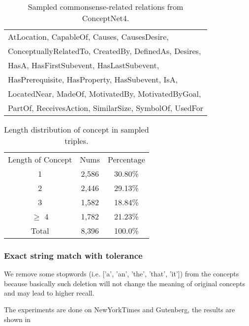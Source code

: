 \begin{table}[th]
	\scriptsize
	\centering
	\begin{tabular}{l}
		\toprule
		AtLocation, CapableOf, Causes, CausesDesire,\\
		ConceptuallyRelatedTo, CreatedBy, DefinedAs, Desires,\\
		HasA, HasFirstSubevent, HasLastSubevent, \\
		HasPrerequisite, HasProperty, HasSubevent, IsA,\\
		LocatedNear, MadeOf, MotivatedBy, MotivatedByGoal,\\
		PartOf, ReceivesAction, SimilarSize, SymbolOf, UsedFor\\
		\toprule
	\end{tabular}
	\caption{Sampled commonsense-related relations from ConceptNet4.}
	\label{table:relation}
\end{table}

\begin{table}[th]
	\scriptsize
	\centering
	\begin{tabular}{ccc}
		\toprule
		Length of Concept & Nums & Percentage \\
		1 & 2,586 & 30.80\% \\
		2 & 2,446 & 29.13\% \\
		3 & 1,582 & 18.84\% \\
		$\geq$ 4 & 1,782 & 21.23\% \\
		\midrule
		Total & 8,396 & 100.0\% \\
		\bottomrule
\end{tabular}
\caption{Length distribution of concept in sampled triples.}
\label{table:lendistribution}
\end{table}

\subsubsection{Exact string match with tolerance}
We remove some stopwords (i.e. ['a', 'an', 'the', 'that', 'it']) from the concepts because basically such deletion will not change the meaning of original concepts and may lead to higher recall. 

The experiments are done on NewYorkTimes and Gutenberg, the results are shown in 


